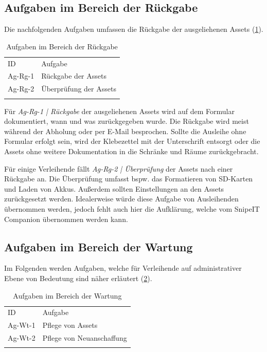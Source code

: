 \subsection{Aufgaben im Bereich der Rückgabe}
Die nachfolgenden Aufgaben umfassen die Rückgabe der ausgeliehenen Assets
(\ref{table:Ag-Rg}).
\begin{table}[h]
        \centering
        \caption{Aufgaben im Bereich der Rückgabe}
        \begin{tabular}{ll}
                \arrayrulecolor{maincolor}\hline
                \sffamily\color{maincolor}ID & \sffamily\color{maincolor}Aufgabe
                \\
                \arrayrulecolor{maincolor}\hline
                Ag-Rg-1                      & Rückgabe der Assets
                \\
                Ag-Rg-2                      & Überprüfung der Assets
                \\
                \arrayrulecolor{maincolor}\hline
        \end{tabular}
        \label{table:Ag-Rg}
\end{table}

Für \textit{Ag-Rg-1 | Rückgabe} der ausgeliehenen Assets wird auf dem Formular
dokumentiert, wann und was zurückgegeben wurde. Die Rückgabe wird meist während
der Abholung oder per E-Mail besprochen. Sollte die Ausleihe ohne Formular erfolgt sein,
wird der Klebezettel mit der Unterschrift entsorgt oder die Assets ohne weitere Dokumentation in die Schränke und Räume
zurückgebracht.

Für einige Verleihende fällt \textit{Ag-Rg-2 | Überprüfung} der Assets nach
einer Rückgabe an. Die Überprüfung umfasst bspw. das Formatieren von SD-Karten
und Laden von Akkus. Außerdem sollten Einstellungen an den Assets zurückgesetzt
werden. Idealerweise würde diese Aufgabe von Ausleihenden übernommen werden,
jedoch fehlt auch hier die Aufklärung, welche vom SnipeIT Companion übernommen
werden kann.
\subsection{Aufgaben im Bereich der Wartung}
\label{subsec:wartung}
Im Folgenden werden Aufgaben, welche für Verleihende auf administrativer Ebene
von Bedeutung sind näher erläutert (\ref{table:Ag-Wt}).

\begin{table}[h]
        \centering
        \caption{Aufgaben im Bereich der Wartung}
        \begin{tabular}{ll}
                \arrayrulecolor{maincolor}\hline
                \sffamily\color{maincolor}ID & \sffamily\color{maincolor}Aufgabe
                \\
                \arrayrulecolor{maincolor}\hline
                Ag-Wt-1                      & Pflege von Assets
                \\
                Ag-Wt-2                      & Pflege von Neuanschaffung
                \\
                \arrayrulecolor{maincolor}\hline
        \end{tabular}
        \label{table:Ag-Wt}
\end{table}

